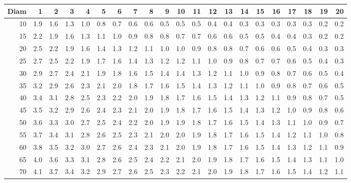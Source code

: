 \documentclass{article}\usepackage[]{graphicx}\usepackage[]{color}
\begin{document}
\begin{table}[ht]
\centering
\begingroup\footnotesize
\begin{tabular}{rrrrrrrrrrrrrrrrrrrrr}
  \hline
Diam & 1 & 2 & 3 & 4 & 5 & 6 & 7 & 8 & 9 & 10 & 11 & 12 & 13 & 14 & 15 & 16 & 17 & 18 & 19 & 20 \\ 
  \hline
10 & 1.9 & 1.6 & 1.3 & 1.0 & 0.8 & 0.7 & 0.6 & 0.6 & 0.5 & 0.5 & 0.5 & 0.4 & 0.4 & 0.3 & 0.3 & 0.3 & 0.3 & 0.3 & 0.2 & 0.2 \\ 
  15 & 2.2 & 1.9 & 1.6 & 1.3 & 1.1 & 1.0 & 0.9 & 0.8 & 0.8 & 0.7 & 0.7 & 0.6 & 0.6 & 0.5 & 0.5 & 0.4 & 0.4 & 0.3 & 0.2 & 0.2 \\ 
  20 & 2.5 & 2.2 & 1.9 & 1.6 & 1.4 & 1.3 & 1.2 & 1.1 & 1.0 & 1.0 & 0.9 & 0.8 & 0.8 & 0.7 & 0.6 & 0.6 & 0.5 & 0.4 & 0.3 & 0.3 \\ 
  25 & 2.7 & 2.5 & 2.2 & 1.9 & 1.7 & 1.6 & 1.4 & 1.3 & 1.2 & 1.2 & 1.1 & 1.0 & 0.9 & 0.8 & 0.7 & 0.7 & 0.6 & 0.5 & 0.4 & 0.3 \\ 
  30 & 2.9 & 2.7 & 2.4 & 2.1 & 1.9 & 1.8 & 1.6 & 1.5 & 1.4 & 1.4 & 1.3 & 1.2 & 1.1 & 1.0 & 0.9 & 0.8 & 0.7 & 0.6 & 0.5 & 0.4 \\ 
  35 & 3.2 & 2.9 & 2.6 & 2.3 & 2.1 & 2.0 & 1.8 & 1.7 & 1.6 & 1.5 & 1.4 & 1.3 & 1.2 & 1.1 & 1.0 & 0.9 & 0.8 & 0.7 & 0.6 & 0.5 \\ 
  40 & 3.4 & 3.1 & 2.8 & 2.5 & 2.3 & 2.2 & 2.0 & 1.9 & 1.8 & 1.7 & 1.6 & 1.5 & 1.4 & 1.3 & 1.2 & 1.1 & 0.9 & 0.8 & 0.7 & 0.5 \\ 
  45 & 3.5 & 3.2 & 2.9 & 2.6 & 2.4 & 2.3 & 2.1 & 2.0 & 1.9 & 1.8 & 1.7 & 1.6 & 1.5 & 1.4 & 1.3 & 1.2 & 1.0 & 0.9 & 0.8 & 0.6 \\ 
  50 & 3.6 & 3.3 & 3.0 & 2.7 & 2.5 & 2.4 & 2.2 & 2.0 & 1.9 & 1.9 & 1.8 & 1.7 & 1.6 & 1.5 & 1.4 & 1.3 & 1.1 & 1.0 & 0.9 & 0.7 \\ 
  55 & 3.7 & 3.4 & 3.1 & 2.8 & 2.6 & 2.5 & 2.3 & 2.1 & 2.0 & 2.0 & 1.9 & 1.8 & 1.7 & 1.6 & 1.5 & 1.4 & 1.2 & 1.1 & 1.0 & 0.8 \\ 
  60 & 3.8 & 3.5 & 3.2 & 3.0 & 2.7 & 2.6 & 2.4 & 2.3 & 2.1 & 2.0 & 1.9 & 1.8 & 1.7 & 1.6 & 1.5 & 1.4 & 1.3 & 1.2 & 1.1 & 0.9 \\ 
  65 & 4.0 & 3.6 & 3.3 & 3.1 & 2.8 & 2.6 & 2.5 & 2.4 & 2.2 & 2.1 & 2.0 & 1.9 & 1.8 & 1.7 & 1.6 & 1.5 & 1.4 & 1.3 & 1.1 & 1.0 \\ 
  70 & 4.1 & 3.7 & 3.4 & 3.2 & 2.9 & 2.7 & 2.6 & 2.5 & 2.3 & 2.2 & 2.1 & 2.0 & 1.9 & 1.8 & 1.7 & 1.6 & 1.5 & 1.4 & 1.2 & 1.1 \\ 

\end{tabular}
\end{table}
\end{document}

